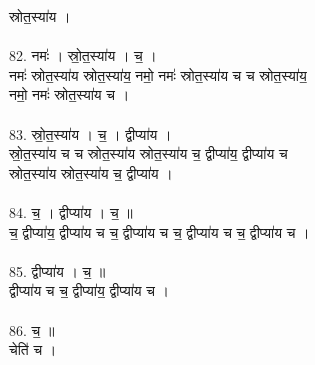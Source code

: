 स्रोत॒स्या॑य ।\\
\\
82. नमः॑ । स्रो॒त॒स्या॑य । च॒ ।\\
नमः॑ स्रोत॒स्या॑य स्रोत॒स्या॑य॒ नमो॒ नमः॑ स्रोत॒स्या॑य च च स्रोत॒स्या॑य॒\\
नमो॒ नमः॑ स्रोत॒स्या॑य च ।\\
\\
83. स्रो॒त॒स्या॑य । च॒ । द्वीप्या॑य ।\\
स्रो॒त॒स्या॑य च च स्रोत॒स्या॑य स्रोत॒स्या॑य च॒ द्वीप्या॑य॒ द्वीप्या॑य च\\
स्रोत॒स्या॑य स्रोत॒स्या॑य च॒ द्वीप्या॑य ।\\
\\
84. च॒ । द्वीप्या॑य । च॒ ॥\\
च॒ द्वीप्या॑य॒ द्वीप्या॑य च च॒ द्वीप्या॑य च च॒ द्वीप्या॑य च च॒ द्वीप्या॑य च ।\\
\\
85. द्वीप्या॑य । च॒ ॥\\
द्वीप्या॑य च च॒ द्वीप्या॑य॒ द्वीप्या॑य च ।\\
\\
86. च॒ ॥\\
चेति॑ च ।\\
